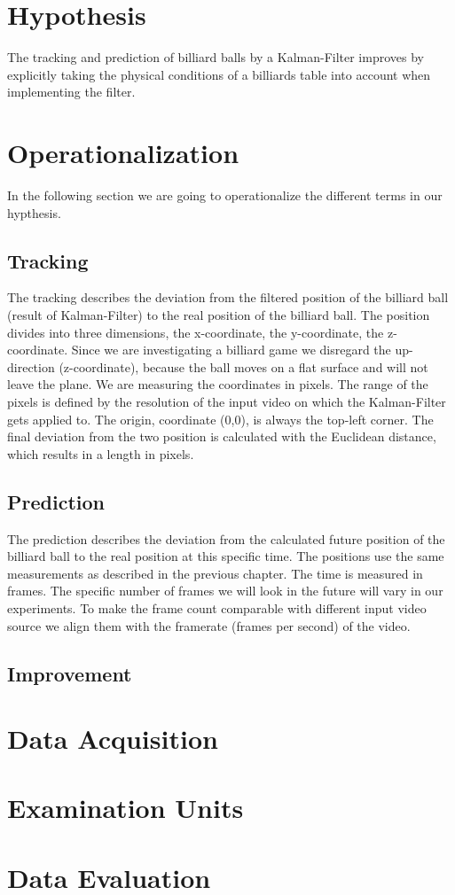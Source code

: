 \documentclass[titlepage, a4paper, 11pt]{scrartcl}
\begin{document}
\section{Hypothesis}

The tracking and prediction of billiard balls by a Kalman-Filter improves by explicitly taking the physical conditions of a billiards table into account when implementing the filter.

\section{Operationalization}

In the following section we are going to operationalize the different terms in our hypthesis.

\subsection{Tracking}

The tracking describes the deviation from the filtered position of the billiard ball (result of Kalman-Filter) to the real position of the billiard ball.
The position divides into three dimensions, the x-coordinate, the y-coordinate, the z-coordinate.
Since we are investigating a billiard game we disregard the up-direction (z-coordinate), because the ball moves on a flat surface and will not leave the plane.
We are measuring the coordinates in pixels. The range of the pixels is defined by the resolution of the input video on which the Kalman-Filter gets applied to.
The origin, coordinate (0,0), is always the top-left corner.
The final deviation from the two position is calculated with the Euclidean distance, which results in a length in pixels.

\subsection{Prediction}

The prediction describes the deviation from the calculated future position of the billiard ball to the real position at this specific time.
The positions use the same measurements as described in the previous chapter.
The time is measured in frames. The specific number of frames we will look in the future will vary in our experiments.
To make the frame count comparable with different input video source we align them with the framerate (frames per second) of the video.

\subsection{Improvement}


\section{Data Acquisition}

\section{Examination Units}

\section{Data Evaluation}


 

\end{document}
